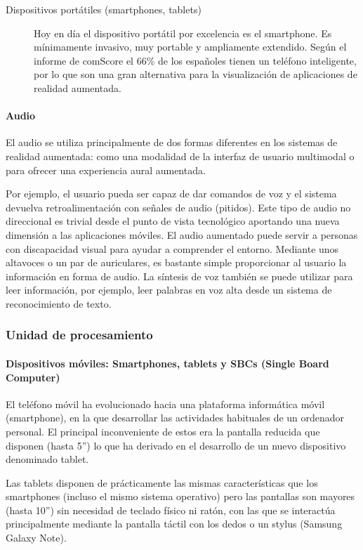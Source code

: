 \begin{description}
\item[Dispositivos portátiles (smartphones, tablets)]
  Hoy en día el dispositivo portátil por excelencia es el smartphone. Es mínimamente invasivo, muy portable y ampliamente extendido. Según el informe de comScore \cite{comScore} el 66\% de los españoles tienen un teléfono inteligente, por lo que son una gran alternativa para la visualización de aplicaciones de realidad aumentada.
\end{description}

\paragraph{Audio}
El audio se utiliza principalmente de dos formas diferentes en los sistemas de realidad aumentada: como una modalidad de la interfaz de usuario multimodal o para ofrecer una experiencia aural aumentada. 

Por ejemplo, el usuario pueda ser capaz de dar comandos de voz y el sistema devuelva retroalimentación con señales de audio (pitidos). Este tipo de audio no direccional es trivial desde el punto de vista tecnológico aportando una nueva dimensión a las aplicaciones móviles. El audio aumentado puede servir a personas con discapacidad visual para ayudar a comprender el entorno. Mediante unos altavoces o un par de auriculares, es bastante simple proporcionar al usuario la información en forma de audio. La síntesis de voz también se puede utilizar para leer información, por ejemplo, leer palabras en voz alta desde un sistema de reconocimiento de texto.

\subsubsection{Unidad de procesamiento}
\paragraph{Dispositivos móviles: Smartphones,  tablets y SBCs (Single Board Computer)}

El teléfono móvil ha evolucionado hacia una plataforma informática móvil (smartphone), en la que desarrollar las actividades habituales de un ordenador personal. El principal inconveniente de estos era la pantalla reducida que disponen (hasta 5”) lo que ha derivado en el desarrollo de un nuevo dispositivo denominado tablet. 

Las tablets disponen de prácticamente las mismas características que los smartphones (incluso el mismo sistema operativo) pero las pantallas son mayores (hasta 10”) sin necesidad de teclado físico ni ratón, con las que se interactúa principalmente mediante la pantalla táctil con los dedos o un stylus (Samsung Galaxy Note).

